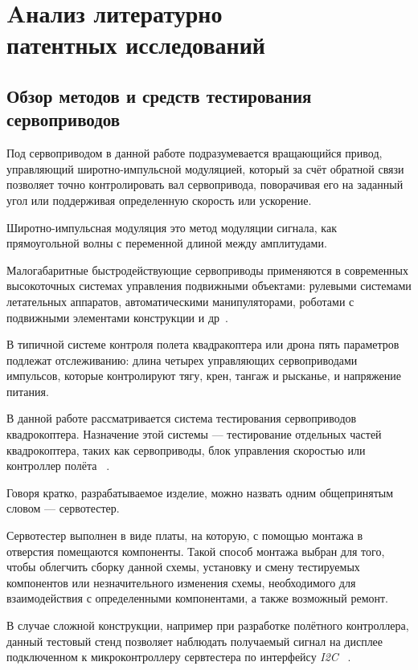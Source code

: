 \section{Aнализ литературно \\ патентных исследований}

\subsection{Обзор методов и средств тестирования сервоприводов}

Под сервоприводом в данной работе подразумевается вращающийся привод,
управляющий широтно-импульсной модуляцией, который за счёт обратной
связи позволяет точно контролировать вал сервопривода, поворачивая его
на заданный угол или поддерживая определенную скорость или ускорение.

Широтно-импульсная модуляция это метод модуляции сигнала, как
прямоугольной волны с переменной длиной между амплитудами.

Малогабаритные быстродействующие сервоприводы применяются в
современных высокоточных системах управления подвижными объектами:
рулевыми системами летательных аппаратов, автоматическими
манипуляторами, роботами с подвижными элементами конструкции и
др~\cite{dyakovSUBSTANTIATIONRELIABILITYSERVOMOTORS2023}.

В типичной системе контроля полета квадракоптера или дрона пять
параметров подлежат отслеживанию: длина четырех управляющих
сервоприводами импульсов, которые контролируют тягу, крен, тангаж и
рысканье, и напряжение питания.

В данной работе рассматривается система тестирования сервоприводов
квадрокоптера.  Назначение этой системы — тестирование отдельных
частей квадрокоптера, таких как сервоприводы,
блок управления скоростью или контроллер полёта ~\cite{Elector521}.

Говоря кратко, разрабатываемое изделие,
можно назвать одним общепринятым словом — сервотестер.

Сервотестер выполнен в виде платы, на которую, с помощью монтажа в
отверстия помещаются компоненты. Такой способ монтажа выбран для того,
чтобы облегчить сборку данной схемы, установку и смену тестируемых
компонентов или незначительного изменения схемы, необходимого для
взаимодействия с определенными компонентами, а также возможный ремонт.

В случае сложной конструкции, например при разработке полётного
контроллера, данный тестовый стенд позволяет наблюдать получаемый
сигнал на дисплее подключенном к микроконтроллеру сервтестера по
интерфейсу \textit{I2C} ~\cite{Elector521}.

